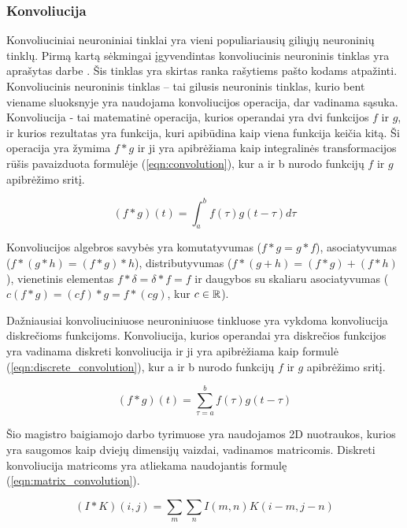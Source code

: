 \subsubsection{Konvoliucija}

Konvoliuciniai neuroniniai tinklai yra vieni populiariausių giliųjų neuroninių tinklų. Pirmą kartą sėkmingai įgyvendintas konvoliucinis neuroninis tinklas yra aprašytas darbe \cite{cnn}. Šis tinklas yra skirtas ranka rašytiems pašto kodams atpažinti. Konvoliucinis neuroninis tinklas -- tai gilusis neuroninis tinklas, kurio bent viename sluoksnyje yra naudojama konvoliucijos operacija, dar vadinama sąsuka. Konvoliucija - tai matematinė operacija, kurios operandai yra dvi funkcijos $f$ ir $g$, ir kurios rezultatas yra funkcija, kuri apibūdina kaip viena funkcija keičia kitą. Ši operacija yra žymima $f * g$ ir ji yra apibrėžiama kaip integralinės transformacijos rūšis pavaizduota formulėje (\ref{eqn:convolution}), kur a ir b nurodo funkcijų  $f$ ir $g$ apibrėžimo sritį.

\begin{equation}
\label{eqn:convolution}
	(f * g)(t) = \int_{a}^{b} f(\tau)g(t - \tau) d\tau
\end{equation}

Konvoliucijos algebros savybės yra komutatyvumas ($f * g = g * f$), asociatyvumas ($f * (g * h) = (f * g) * h$), distributyvumas ($f * (g + h) = (f * g) + (f * h)$), vienetinis elementas $f * \delta = \delta * f = f$ ir daugybos su skaliaru asociatyvumas ($c(f * g) = (cf) * g = f * (cg)$, kur $c \in \mathbb{R}$).

Dažniausiai konvoliuciniuose neuroniniuose tinkluose yra vykdoma konvoliucija diskrečioms funkcijoms. Konvoliucija, kurios operandai yra diskrečios funkcijos yra vadinama diskreti konvoliucija ir ji yra apibrėžiama kaip formulė (\ref{eqn:discrete_convolution}), kur a ir b nurodo funkcijų  $f$ ir $g$ apibrėžimo sritį.

\begin{equation}
\label{eqn:discrete_convolution}
	(f * g)(t) = \sum_{\tau = a}^{b} f(\tau)g(t - \tau)
\end{equation}

Šio magistro baigiamojo darbo tyrimuose yra naudojamos 2D nuotraukos, kurios yra saugomos kaip dviejų dimensijų vaizdai, vadinamos matricomis. Diskreti konvoliucija matricoms yra atliekama naudojantis formulę (\ref{eqn:matrix_convolution}).

\begin{equation}
\label{eqn:matrix_convolution}
	(I * K)(i, j) = \sum_{m} \sum_{n} I(m, n) K(i - m, j - n)
\end{equation}

